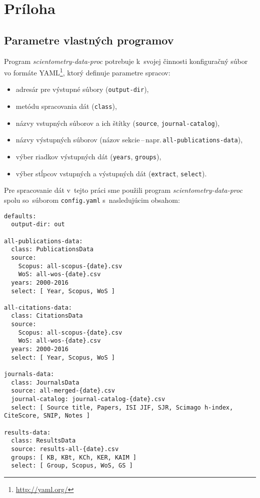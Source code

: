 \chapter*{Príloha}

\section*{Parametre  vlastných programov}

Program \emph{scientometry-data-proc} potrebuje k~svojej činnosti konfiguračný
súbor vo formáte YAML\footnote{\url{http://yaml.org/}}, ktorý definuje parametre
spracov:
\begin{itemize}
  \item adresár pre výstupné súbory (\verb|output-dir|),
  \item metódu spracovania dát (\verb|class|),
  \item názvy vstupných súborov a ich štítky (\verb|source|, \verb|journal-catalog|),
  \item názvy výstupných súborov (názov sekcie\,--\,napr.\,\verb|all-publications-data|),
  \item výber riadkov výstupných dát (\verb|years|, \verb|groups|),
  \item výber stĺpcov vstupných a výstupných dát (\verb|extract|, \verb|select|).
\end{itemize}
Pre spracovanie dát v~tejto práci sme použili program
\emph{scientometry-data-proc} spolu so~súborom \verb|config.yaml|
s~nasledujúcim obsahom:

\begin{source}
\begin{verbatim}
defaults:
  output-dir: out

all-publications-data:
  class: PublicationsData
  source:
    Scopus: all-scopus-{date}.csv
    WoS: all-wos-{date}.csv
  years: 2000-2016
  select: [ Year, Scopus, WoS ]

all-citations-data:
  class: CitationsData
  source:
    Scopus: all-scopus-{date}.csv
    WoS: all-wos-{date}.csv
  years: 2000-2016
  select: [ Year, Scopus, WoS ]

journals-data:
  class: JournalsData
  source: all-merged-{date}.csv
  journal-catalog: journal-catalog-{date}.csv
  select: [ Source title, Papers, ISI JIF, SJR, Scimago h-index, CiteScore, SNIP, Notes ]

results-data:
  class: ResultsData
  source: results-all-{date}.csv
  groups: [ KB, KBt, KCh, KER, KAIM ]
  select: [ Group, Scopus, WoS, GS ]
\end{verbatim}
\end{source}

